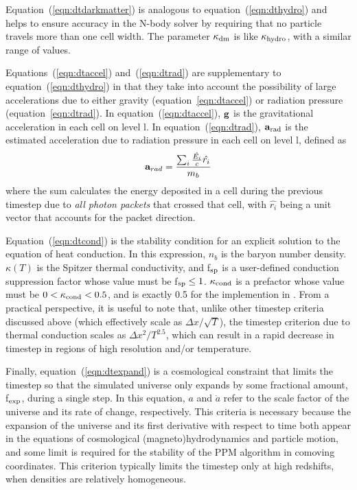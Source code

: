Equation~(\ref{eqn:dtdarkmatter}) is analogous to
equation~(\ref{eqn:dthydro}) and helps to ensure accuracy in the N-body solver
by requiring that no particle travels more than one cell
width.  The parameter $\kappa_{\rm dm}$ is like $\kappa_{\rm
hydro}$, with a similar range of values.

Equations~(\ref{eqn:dtaccel}) and~(\ref{eqn:dtrad}) are supplementary to equation~(\ref{eqn:dthydro}) in that they
take into account the possibility of large accelerations due to either
gravity (equation~\ref{eqn:dtaccel}) or radiation pressure
(equation~\ref{eqn:dtrad}).  In equation~(\ref{eqn:dtaccel}), $\mathbf{g}$ is the
gravitational acceleration in each cell on level l.  In
equation~(\ref{eqn:dtrad}), $\mathbf{a}_{\rm rad}$ is the estimated
acceleration due to radiation pressure in each cell on level l,
defined as
\begin{equation}
\myvec{a}_{rad} = \frac{ \sum_i \frac{\dot{E_i}}{c} \hat{r_i} }{m_b} 
\end{equation}
where the sum calculates the energy deposited in a cell during the
previous timestep due to \textit{all photon packets} that crossed that
cell, with $\hat{r_i}$ being a unit vector that accounts for the
packet direction.

Equation~(\ref{eqn:dtcond}) is the stability condition for an explicit
solution to the equation of heat conduction.  In this expression,
$n_b$ is the baryon number density. 
$\kappa(T)$ is the Spitzer thermal conductivity, and f$_{\rm sp}$ is a user-defined
conduction suppression factor whose value must be f$_{\rm sp} \leq 1$.  
$\kappa_{\rm cond}$ is a prefactor whose
value must be $0 < \kappa_{\rm cond}  < 0.5$, and is exactly 0.5 for the
implemention in \enzo.
From a practical
perspective, it is useful to note that, unlike other timestep criteria
discussed above (which effectively scale as $\Delta x / \sqrt{T}$),
the timestep criterion due to thermal conduction scales as $\Delta x^2
/ T^{2.5}$, which can result in a rapid decrease in timestep in
regions of high resolution and/or temperature.

Finally, equation~(\ref{eqn:dtexpand}) is a cosmological constraint that
limits the timestep so that the simulated universe only expands by
some fractional amount, f$_{\rm exp}$, during a single step.  In this
equation, $a$ and $\dot{a}$ refer to the scale factor of the universe
and its rate of change, respectively.  This criteria is necessary
because the expansion of the universe and its first derivative with
respect to time both appear in the equations of cosmological
(magneto)hydrodynamics and particle motion, and some limit is required
for the stability of the PPM algorithm in comoving coordinates.  This
criterion typically limits the timestep
only at high redshifts, when densities are relatively homogeneous.

